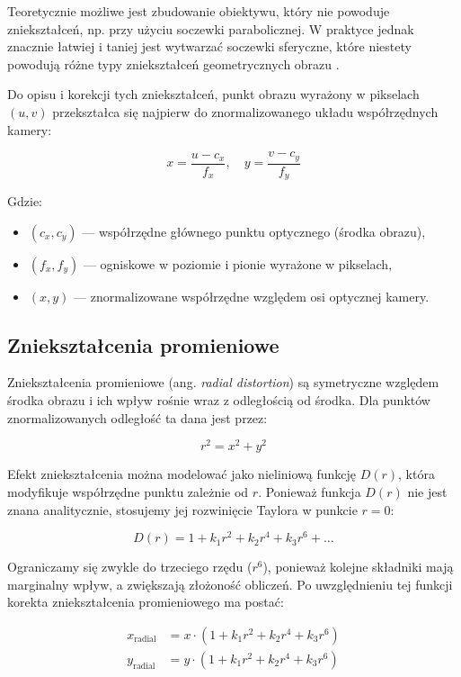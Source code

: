 \documentclass[magisterska]{pracadypl}
\begin{document}
Teoretycznie możliwe jest zbudowanie obiektywu, który nie powoduje zniekształceń, np. przy użyciu soczewki parabolicznej. W praktyce jednak znacznie łatwiej i taniej jest wytwarzać soczewki sferyczne, które niestety powodują różne typy zniekształceń geometrycznych obrazu \cite{dystorsja}.

Do opisu i korekcji tych zniekształceń, punkt obrazu wyrażony w pikselach \( (u, v) \) przekształca się najpierw do znormalizowanego układu współrzędnych kamery:

\[
x = \frac{u - c_x}{f_x}, \quad y = \frac{v - c_y}{f_y}
\]

Gdzie:
\begin{itemize}
    \item \( (c_x, c_y) \) — współrzędne głównego punktu optycznego (środka obrazu),
    \item \( (f_x, f_y) \) — ogniskowe w poziomie i pionie wyrażone w pikselach,
    \item \( (x, y) \) — znormalizowane współrzędne względem osi optycznej kamery.
\end{itemize}

\subsection*{Zniekształcenia promieniowe}

Zniekształcenia promieniowe (ang. \textit{radial distortion}) \cite{promieniowe} są symetryczne względem środka obrazu i ich wpływ rośnie wraz z odległością od środka. Dla punktów znormalizowanych odległość ta dana jest przez:

\[
r^2 = x^2 + y^2
\]

Efekt zniekształcenia można modelować jako nieliniową funkcję \( D(r) \), która modyfikuje współrzędne punktu zależnie od \( r \). Ponieważ funkcja \( D(r) \) nie jest znana analitycznie, stosujemy jej rozwinięcie Taylora w punkcie \( r = 0 \):

\[
D(r) = 1 + k_1 r^2 + k_2 r^4 + k_3 r^6 + \ldots
\]

Ograniczamy się zwykle do trzeciego rzędu (\( r^6 \)), ponieważ kolejne składniki mają marginalny wpływ, a zwiększają złożoność obliczeń. Po uwzględnieniu tej funkcji korekta zniekształcenia promieniowego ma postać:

\begin{align*}
x_{\text{radial}} &= x \cdot \left(1 + k_1 r^2 + k_2 r^4 + k_3 r^6 \right) \\
y_{\text{radial}} &= y \cdot \left(1 + k_1 r^2 + k_2 r^4 + k_3 r^6 \right)
\end{align*}
\end{document}
